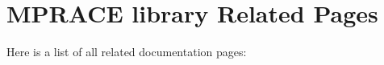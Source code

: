 \section{MPRACE library Related Pages}
Here is a list of all related documentation pages:\begin{CompactList}
\item {}

\end{CompactList}
